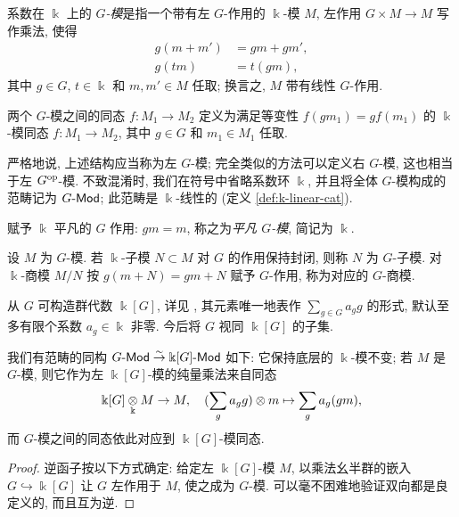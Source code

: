\begin{definition}\label{def:G-mod}
	系数在 $\Bbbk$ 上的 \emph{$G$-模}是指一个带有左 $G$-作用的 $\Bbbk$-模 $M$, 左作用 $G \times M \to M$ 写作乘法, 使得
	\begin{align*}
		g(m + m') & = gm + gm', \\
		g(tm) & = t(gm),
	\end{align*}
	其中 $g \in G$, $t \in \Bbbk$ 和 $m, m' \in M$ 任取; 换言之, $M$ 带有线性 $G$-作用.
	
	两个 $G$-模之间的同态 $f: M_1 \to M_2$ 定义为满足等变性 $f(gm_1) = gf(m_1)$ 的 $\Bbbk$-模同态 $f: M_1 \to M_2$, 其中 $g \in G$ 和 $m_1 \in M_1$ 任取.
\end{definition}

严格地说, 上述结构应当称为左 $G$-模; 完全类似的方法可以定义右 $G$-模, 这也相当于左 $G^{\operatorname{op}}$-模. 不致混淆时, 我们在符号中省略系数环 $\Bbbk$, 并且将全体 $G$-模构成的范畴记为 $G\text{-}\mathsf{Mod}$; 此范畴是 $\Bbbk$-线性的 (定义 \ref{def:k-linear-cat}).

\begin{example}\label{eg:trivial-G-mod}
	赋予 $\Bbbk$ 平凡的 $G$ 作用: $gm = m$, 称之为\emph{平凡 $G$-模}, 简记为 $\Bbbk$.
\end{example}

\begin{definition}
	设 $M$ 为 $G$-模. 若 $\Bbbk$-子模 $N \subset M$ 对 $G$ 的作用保持封闭, 则称 $N$ 为 $G$-子模. 对 $\Bbbk$-商模 $M/N$ 按 $g(m+N) = gm + N$ 赋予 $G$-作用, 称为对应的 $G$-商模.
\end{definition}

从 $G$ 可构造群代数 $\Bbbk[G]$, 详见 \cite[定义 5.6.3]{Li1}, 其元素唯一地表作 $\sum_{g \in G} a_g g$ 的形式, 默认至多有限个系数 $a_g \in \Bbbk$ 非零. 今后将 $G$ 视同 $\Bbbk[G]$ 的子集.

\begin{proposition}\label{prop:G-mod-kG}
	我们有范畴的同构 $G\text{-}\mathsf{Mod} \stackrel{\sim}{\rightarrow} \Bbbk[G]\text{-}\mathsf{Mod}$ 如下: 它保持底层的 $\Bbbk$-模不变; 若 $M$ 是 $G$-模, 则它作为左 $\Bbbk[G]$-模的纯量乘法来自同态
	\[ \Bbbk[G] \underset{\Bbbk}{\otimes} M \to M, \quad (\sum_g a_g g) \otimes m \mapsto \sum_g a_g (gm), \]
	而 $G$-模之间的同态依此对应到 $\Bbbk[G]$-模同态.
\end{proposition}
\begin{proof}
	逆函子按以下方式确定: 给定左 $\Bbbk[G]$-模 $M$, 以乘法幺半群的嵌入 $G \hookrightarrow \Bbbk[G]$ 让 $G$ 左作用于 $M$, 使之成为 $G$-模. 可以毫不困难地验证双向都是良定义的, 而且互为逆.
\end{proof}

